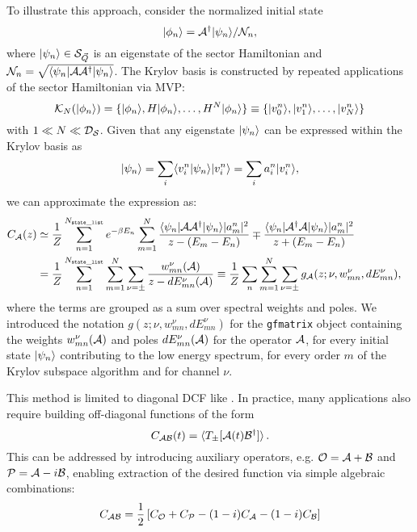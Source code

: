 \documentclass[edipack_sp.tex]{subfiles}
\begin{document}
To illustrate this approach, consider the normalized initial state
$$
\ket{\phi_n}=\AA^\dagger\ket{\psi_n}/\NN_n,
$$
where  $\ket{\psi_n}\in\SS_{\vec{Q}}$ is an eigenstate of the sector Hamiltonian and $\NN_n=\sqrt{\bra{\psi_n}\AA
  \AA^\dagger\ket{\psi_n}}$.
The Krylov basis is constructed by repeated applications of the sector Hamiltonian via MVP: 
$$
\mathcal{K}_{N} (\ket{\phi_n})=\{\ket{\phi_n}, H\ket{\phi_n}, \dots,
H^N\ket{\phi_n}\}\equiv \{\ket{v^n_0}, \ket{v^n_1},\dots, \ket{v^n_N}
\}
$$ 
with $1 \ll N \ll \DD_\SS$.
Given that any eigenstate $\ket{\psi_n}$ can be expressed within the Krylov basis as
$$
\ket{\psi_n} = \sum_i  \ibra v^n_i|\psi_n \iket  \ket{ v^n_i} =
\sum_i a^n_i \ket{v^n_i}, 
$$
we can approximate the expression  as:  
\begin{equation}
  \label{eqGKrylov}
  \begin{split}
    C_\AA(z)  &\simeq \frac{1}{Z}\sum_{n=1}^{N_{\tt state\_list}} e^{-\beta E_n}
    \sum_{m=1}^{N} \frac{\bra{\psi_n}\AA \AA^\dagger\ket{\psi_n} |a^n_m|^2}{
      z - (E_m-E_n)} \mp \frac{\bra{\psi_n}\AA^\dagger \AA\ket{\psi_n}
      |a^n_m|^2}{ z + (E_m-E_n)}\cr
    &= \frac{1}{Z}\sum_{n=1}^{N_{\tt state\_list}}\sum_{m=1}^{N} \sum_{\nu=\pm}\frac{w^{\nu}_{mn}(\AA)}{z - dE^\nu_{mn}(\AA)} 
    \equiv \frac{1}{Z}\sum_n
    \sum_{m=1}^{N} \sum_{\nu=\pm} g_\AA(z;\nu, w^{\nu}_{mn},  dE^\nu_{mn}), \cr
  \end{split}
\end{equation}
where the terms are grouped as a sum over spectral weights and
poles. We introduced the notation $g(z;\nu, w^{\nu}_{mn},  dE^\nu_{mn})$
for the {\tt gfmatrix} object containing the weights $w^{\nu}_{mn}(\AA)$ and
poles $dE^{\nu}_{mn}(\AA)$ for the operator $\AA$, for every initial state $\ket{\psi_n}$
contributing to the low energy spectrum, for every order $m$ of the
Krylov subspace algorithm and for channel $\nu$.

This method is  limited to diagonal DCF like
. In practice, many applications also require building off-diagonal
functions of the form
$$
C_{\AA\BB}(t) = \ibra T_{\pm}[\AA(t) \BB^\dagger]\iket\, .
$$
This can be addressed by introducing auxiliary operators, e.g.  $\OO=\AA +\BB$ and
$\PP=\AA-i\BB$, enabling extraction of the desired function via
simple algebraic combinations:
$$
C_{\AA\BB} = \frac{1}{2}\left[C_\OO + C_\PP - (1-i)C_\AA -(1-i)C_\BB\right]
$$
\end{document}
